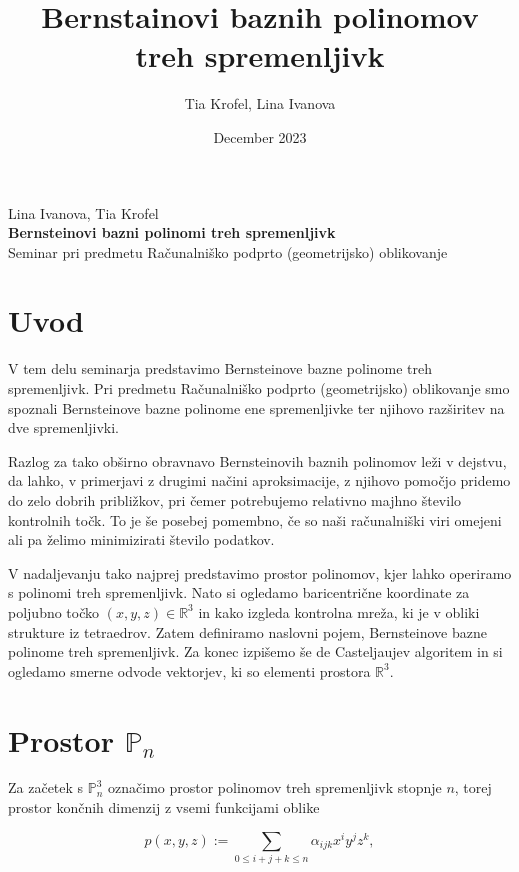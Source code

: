 \documentclass[a4paper, 12pt]{article}
\title{Bernstainovi baznih polinomov treh spremenljivk}
\author{Tia Krofel, Lina Ivanova}
\date{December 2023}
\theoremstyle{definition} %
\theoremstyle{plain} %
\newcommand{\program}{Finančna matematika}
\newcommand{\imeavtorja}{Lina Ivanova, Tia Krofel}
\newcommand{\naslovdela}{Bernsteinovi bazni polinomi treh spremenljivk}
\begin{document}
\thispagestyle{empty}
\vfill

\begin{center}{\large
\imeavtorja\\[2mm]
{\bf \naslovdela}\\[10mm]
Seminar pri predmetu Računalniško podprto (geometrijsko) oblikovanje\\[1cm]
}
\end{center}
\vfill

\pagebreak

\section{Uvod}

V tem delu seminarja predstavimo Bernsteinove bazne polinome 
treh spremenljivk. Pri predmetu Računalniško podprto (geometrijsko)
oblikovanje smo spoznali Bernsteinove bazne polinome ene spremenljivke ter  
njihovo razširitev na dve spremenljivki.

Razlog za tako obširno obravnavo Bernsteinovih baznih polinomov leži v dejstvu, 
da lahko, v primerjavi z drugimi načini aproksimacije, z njihovo pomočjo 
pridemo do zelo dobrih približkov, pri čemer potrebujemo relativno majhno število 
kontrolnih točk. To je še posebej pomembno, če so naši računalniški viri omejeni 
ali pa želimo minimizirati število podatkov.

V nadaljevanju tako najprej predstavimo prostor polinomov,
kjer lahko operiramo s polinomi treh spremenljivk. Nato si ogledamo 
baricentrične koordinate za poljubno točko $(x,y,z)\in\mathbb{R}^3$ in kako izgleda 
kontrolna mreža, ki je v obliki strukture iz tetraedrov.
Zatem definiramo naslovni pojem, Bernsteinove bazne polinome 
treh spremenljivk. Za konec izpišemo še de Casteljaujev algoritem 
in si ogledamo smerne odvode vektorjev, ki so elementi prostora $\mathbb{R}^3$.

\section{Prostor $\mathbb{P}_n$}

Za začetek s $\mathbb{P}_n^3$ označimo prostor polinomov treh spremenljivk stopnje $n$, 
torej prostor končnih dimenzij z vsemi funkcijami oblike 

$$ p(x,y,z):=\sum_{0\leq i+j+k\leq n}\alpha_{ijk}x^iy^jz^k,$$
\end{document}
